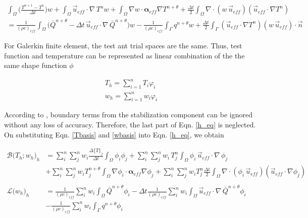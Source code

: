 \begin{equation}
\begin{split}		\label{h_eq}
\int_{\Omega}\Big(\frac{T^{n+1}-T^n}{\Delta t}\Big)w+\int_{\Omega}\vec{u}_{eff}\cdot \nabla\,T^nw+\int_{\Omega}\nabla w\cdot\mathbf{\alpha}_{eff}\nabla T^{n+\theta}+\frac{\Delta t}{2}\int_{\Omega}\nabla\cdot(w\,\vec{u}_{eff})(\vec{u}_{eff}\cdot\nabla T^n)	\\
=\frac{1}{(\rho c )_{eff}}\int_{\Omega}\big(\bar{Q}^{n+\theta}- \Delta t\, \vec{u}_{eff}\cdot  \nabla\,\bar{Q}^{n+\theta}\big)w-\frac{1}{(\rho c)_{eff}}\int_{\Gamma}q^{n+\theta}w+\frac{\Delta t}{2}\int_{\Gamma}(\vec{u}_{eff}\cdot\nabla T^n)(w\,\vec{u}_{eff})\cdot\vec{n}
\end{split}
\end{equation}

For Galerkin finite element, the test ant trial spaces are the same. Thus, test function and temperature can be represented as linear combination of the the same shape function $\phi$

\begin{gather}		
T_h=\sum_{i=1}^nT_i\varphi_i	\label{Tbasis}\\
w_h=\sum_{i=1}^nw_i\varphi_i\label{wbasis}
\end{gather}

According to , boundary terms from the stabilization component can be ignored without any loss of accuracy. Therefore, the last part of Eqn. \ref{h_eq} is neglected. On substituting Eqn. \ref{Tbasis} and \ref{wbasis} into Eqn. \ref{h_eq}, we obtain

\begin{equation}      \label{h_eq1}
\begin{split}		
 \mathcal{B}\big(T_h;  w_h\big)_h & = \sum_i^n\sum_j^nw_i\frac{\Delta \{T\}_j}{\Delta t}\int_{\Omega}\phi_i\phi_j+\sum_i^n\sum_j^nw_i\,T^n_j\int_{\Omega}\phi_i\,\vec{u}_{eff}\cdot \nabla\,\phi_j	\\
&+\sum_i^n\sum_j^nw_iT^{n+\theta}_j\int_{\Omega}\nabla \phi_i\cdot\mathbf{\alpha}_{eff}\nabla \phi_j+\sum_i^n\sum_j^nw_iT^n_j\frac{\Delta t}{2}\int_{\Omega}\nabla\cdot(\phi_i\,\vec{u}_{eff})(\vec{u}_{eff}\cdot\nabla \phi_j)	
\\
\\
\mathcal{L}\big(w_h\big)_h &=\frac{1}{(\rho c )_{eff}}\sum_i^nw_i\int_{\Omega}\bar{Q}^{n+\theta}\phi_i- \Delta t\frac{1}{(\rho c )_{eff}}\sum_i^nw_i\int_{\Omega} \vec{u}_{eff}\cdot  \nabla\,\bar{Q}^{n+\theta}\phi_i		\\
&-\frac{1}{(\rho c)_{eff}}\sum_i^nw_i\int_{\Gamma}q^{n+\theta}\phi_i
\end{split}
\end{equation}

